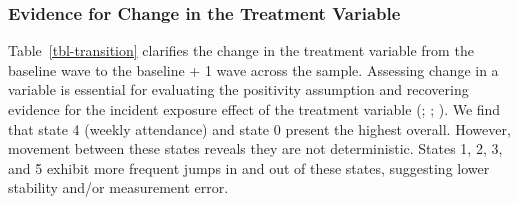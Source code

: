 \documentclass[
  single column]{article}
\begin{document}
\newpage{}

\subsubsection{Evidence for Change in the Treatment
Variable}\label{evidence-for-change-in-the-treatment-variable}

Table~\ref{tbl-transition} clarifies the change in the treatment
variable from the baseline wave to the baseline + 1 wave across the
sample. Assessing change in a variable is essential for evaluating the
positivity assumption and recovering evidence for the incident exposure
effect of the treatment variable (; ; ).
We find that state 4 (weekly attendance) and state 0 present the highest
overall. However, movement between these states reveals they are not
deterministic. States 1, 2, 3, and 5 exhibit more frequent jumps in and
out of these states, suggesting lower stability and/or measurement
error.
\end{document}
